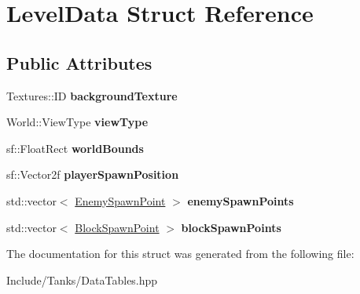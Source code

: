 \hypertarget{struct_level_data}{}\section{Level\+Data Struct Reference}
\label{struct_level_data}
\subsection*{Public Attributes}
\begin{DoxyCompactItemize}
\item 
\hypertarget{struct_level_data_a406ab5513d875228b1cef9bfe445ed65}{}Textures\+::\+I\+D {\bfseries background\+Texture}\label{struct_level_data_a406ab5513d875228b1cef9bfe445ed65}

\item 
\hypertarget{struct_level_data_a255b0e592f1e66b66f155e6574bc3978}{}World\+::\+View\+Type {\bfseries view\+Type}\label{struct_level_data_a255b0e592f1e66b66f155e6574bc3978}

\item 
\hypertarget{struct_level_data_a19d1bba4aa13d1e0e73a3b2b5f67ad0b}{}sf\+::\+Float\+Rect {\bfseries world\+Bounds}\label{struct_level_data_a19d1bba4aa13d1e0e73a3b2b5f67ad0b}

\item 
\hypertarget{struct_level_data_a458576f1378738a57d6bb75d6bc975f4}{}sf\+::\+Vector2f {\bfseries player\+Spawn\+Position}\label{struct_level_data_a458576f1378738a57d6bb75d6bc975f4}

\item 
\hypertarget{struct_level_data_ad4a2359abca4b03d93dfd4115e909620}{}std\+::vector$<$ \hyperlink{struct_enemy_spawn_point}{Enemy\+Spawn\+Point} $>$ {\bfseries enemy\+Spawn\+Points}\label{struct_level_data_ad4a2359abca4b03d93dfd4115e909620}

\item 
\hypertarget{struct_level_data_a200661b03076406a0648f45bcf6d5d44}{}std\+::vector$<$ \hyperlink{struct_block_spawn_point}{Block\+Spawn\+Point} $>$ {\bfseries block\+Spawn\+Points}\label{struct_level_data_a200661b03076406a0648f45bcf6d5d44}

\end{DoxyCompactItemize}


The documentation for this struct was generated from the following file\+:\begin{DoxyCompactItemize}
\item 
Include/\+Tanks/Data\+Tables.\+hpp\end{DoxyCompactItemize}

